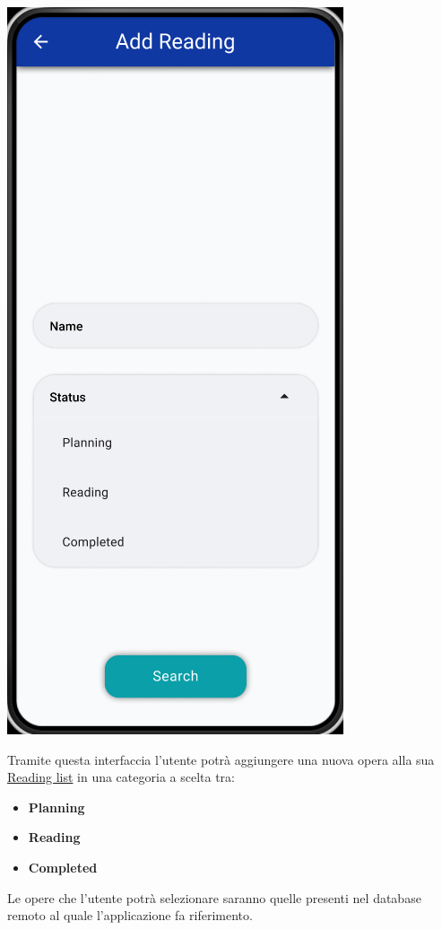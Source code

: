 \documentclass{report}
\begin{document}
\begin{center}
   \includegraphics[scale=0.4]{add_reading.png}
\end{center}

Tramite questa interfaccia l'utente potrà aggiungere una nuova opera alla sua \hyperref[sec:reading_list]{Reading list} in una categoria a scelta tra:
\begin{itemize}
   \item \textbf{Planning}
   \item \textbf{Reading}
   \item \textbf{Completed}
\end{itemize}
Le opere che l'utente potrà selezionare saranno quelle presenti nel database remoto al quale l'applicazione fa riferimento.
\end{document}
